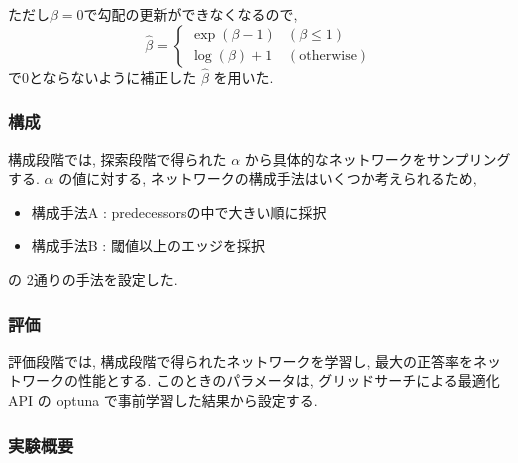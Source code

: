 ただし$\beta=0$で勾配の更新ができなくなるので,
\begin{equation}
  \label{equ:beta}
  \hat{\beta} = \begin{cases}
    \exp(\beta - 1) & (\beta \leq 1) \\
    \log(\beta) + 1 & (\mathrm{otherwise})
  \end{cases}
\end{equation}
で0とならないように補正した $\hat{\beta}$ を用いた.

\subsubsection{構成}

構成段階では, 探索段階で得られた $\alpha$ から具体的なネットワークをサンプリングする.
$\alpha$ の値に対する, ネットワークの構成手法はいくつか考えられるため,
\begin{itemize}
  \item 構成手法A : predecessorsの中で大きい順に採択
  \item 構成手法B : 閾値以上のエッジを採択
\end{itemize}
の 2通りの手法を設定した.

\subsubsection{評価}
評価段階では, 構成段階で得られたネットワークを学習し,
最大の正答率をネットワークの性能とする.
このときのパラメータは, グリッドサーチによる最適化API の optuna で事前学習した結果から設定する.


\changeindent{0cm}
\subsubsection{実験概要}
\label{sec:pred.01_03}
\changeindent{2cm}


